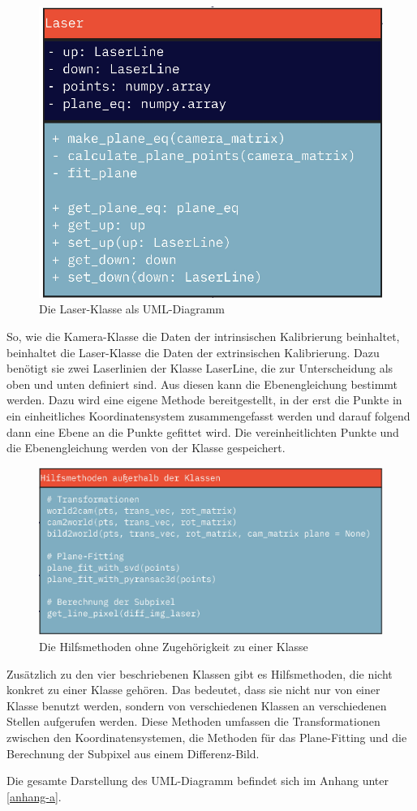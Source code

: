 		\begin{figure}[h]
			\centering
			\includegraphics[width=0.35\linewidth]{img/hauptteil/software/Laser_UML.png}
			\caption{Die Laser-Klasse als UML-Diagramm}
			\label{fig:laser_uml}
		\end{figure}
		So, wie die Kamera-Klasse die Daten der intrinsischen Kalibrierung beinhaltet, beinhaltet die Laser-Klasse die Daten der extrinsischen Kalibrierung. Dazu benötigt sie zwei Laserlinien der Klasse LaserLine, die zur Unterscheidung als \glqq oben\grqq{} und \glqq unten\grqq{} definiert sind. Aus diesen kann die Ebenengleichung bestimmt werden. Dazu wird eine eigene Methode bereitgestellt, in der erst die Punkte in ein einheitliches Koordinatensystem zusammengefasst werden und darauf folgend dann eine Ebene an die Punkte gefittet wird. Die vereinheitlichten Punkte und die Ebenengleichung werden von der Klasse gespeichert.
		\newpage
		\begin{figure}[h]
			\centering
			\includegraphics[width=0.7\linewidth]{img/hauptteil/software/Hilfsmethoden_UML.png}
			\caption{Die Hilfsmethoden ohne Zugehörigkeit zu einer Klasse}
			\label{fig:hilfsmethoden_uml}
		\end{figure}
		Zusätzlich zu den vier beschriebenen Klassen gibt es Hilfsmethoden, die nicht konkret zu einer Klasse gehören. Das bedeutet, dass sie nicht nur von einer Klasse benutzt werden, sondern von verschiedenen Klassen an verschiedenen Stellen aufgerufen werden. Diese Methoden umfassen die Transformationen zwischen den Koordinatensystemen, die Methoden für das Plane-Fitting und die Berechnung der Subpixel aus einem Differenz-Bild.
		
		Die gesamte Darstellung des UML-Diagramm befindet sich im Anhang unter \ref{anhang-a}.
		
